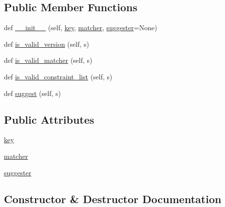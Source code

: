 \subsection*{Public Member Functions}
\begin{DoxyCompactItemize}
\item 
def \hyperlink{classpip_1_1__vendor_1_1distlib_1_1version_1_1VersionScheme_ab3b749ecce8db068adf8aa2325ab1677}{\+\_\+\+\_\+init\+\_\+\+\_\+} (self, \hyperlink{classpip_1_1__vendor_1_1distlib_1_1version_1_1VersionScheme_a7935f941e8213e7c2cc6221e68e6311f}{key}, \hyperlink{classpip_1_1__vendor_1_1distlib_1_1version_1_1VersionScheme_a3148c6c1e0c9dececd31d0db7950ed67}{matcher}, \hyperlink{classpip_1_1__vendor_1_1distlib_1_1version_1_1VersionScheme_a1036d7c8658ba12d4e00d487ee7b496b}{suggester}=None)
\item 
def \hyperlink{classpip_1_1__vendor_1_1distlib_1_1version_1_1VersionScheme_ab017e31b1700d18d2b53443572f2d7fb}{is\+\_\+valid\+\_\+version} (self, s)
\item 
def \hyperlink{classpip_1_1__vendor_1_1distlib_1_1version_1_1VersionScheme_af4865376a14f4f73f77545bdc29a82fc}{is\+\_\+valid\+\_\+matcher} (self, s)
\item 
def \hyperlink{classpip_1_1__vendor_1_1distlib_1_1version_1_1VersionScheme_a1b12704318ce01984b90f7bd8acaaf72}{is\+\_\+valid\+\_\+constraint\+\_\+list} (self, s)
\item 
def \hyperlink{classpip_1_1__vendor_1_1distlib_1_1version_1_1VersionScheme_a75fb252ff1bc0e1b9be8c46b59891078}{suggest} (self, s)
\end{DoxyCompactItemize}
\subsection*{Public Attributes}
\begin{DoxyCompactItemize}
\item 
\hyperlink{classpip_1_1__vendor_1_1distlib_1_1version_1_1VersionScheme_a7935f941e8213e7c2cc6221e68e6311f}{key}
\item 
\hyperlink{classpip_1_1__vendor_1_1distlib_1_1version_1_1VersionScheme_a3148c6c1e0c9dececd31d0db7950ed67}{matcher}
\item 
\hyperlink{classpip_1_1__vendor_1_1distlib_1_1version_1_1VersionScheme_a1036d7c8658ba12d4e00d487ee7b496b}{suggester}
\end{DoxyCompactItemize}


\subsection{Constructor \& Destructor Documentation}
\mbox{\label{classpip_1_1__vendor_1_1distlib_1_1version_1_1VersionScheme_ab3b749ecce8db068adf8aa2325ab1677}} 
